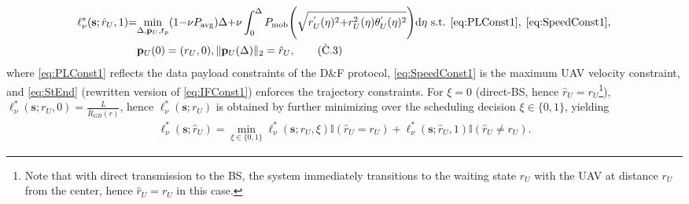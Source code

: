 \documentclass[12pt, draftcls, onecolumn]{IEEEtran}
\theoremstyle{plain}
\theoremstyle{definition}
\theoremstyle{remark}
\begin{document}
\begin{align}
    \ell_{\nu}^{*}(\mathbf{s};\hat{r}_{U},1){=}&\underset{\Delta,\mathbf{p}_{U},t_{p}}{\mathrm{min}}(1{-}\nu P_{\mathrm{avg}})\Delta{+}\nu\int_{0}^{\Delta}P_{\mathrm{mob}}\Bigg(\sqrt{r_{U}^{'}(\eta)^{2}{+}r_{U}^{2}(\eta)\theta_{U}^{'}(\eta)^{2}}\Bigg)\mathrm{d}\eta \text{ s.t.}\;\, \text{\ref{eq:PLConst1}},\; \text{\ref{eq:SpeedConst1}},\label{eq:EllMin}\\
    &\mathbf{p}_{U}(0) =(r_U,0), \Vert \mathbf{p}_{U}(\Delta)\Vert_{2} =\hat{r}_U,\tag{$\hat{\text{C}}$.3}\label{eq:StEnd}\
\end{align}
where \ref{eq:PLConst1} reflects the data payload constraints of the D\&F protocol, \ref{eq:SpeedConst1} is the maximum UAV velocity constraint, and \ref{eq:StEnd} (rewritten version of \ref{eq:IFConst1}) enforces the trajectory constraints. For $\xi{=}0$ (direct-BS, hence $\hat{r}_{U}{=}r_{U}$\footnote{Note that with direct transmission to the BS, the system immediately transitions to the waiting state $r_{U}$ with the UAV at distance $r_{U}$ from the center, hence $\hat{r}_{U}{=}r_{U}$ in this case.}), $\ell_{\nu}^{*}(\mathbf{s};r_{U},0){=}\frac{L}{\bar{R}_{GB}(r)}$, hence $\ell_{\nu}^{*}(\mathbf{s};r_{U})$ is obtained by further minimizing over the scheduling decision $\xi{\in}\{0,1\}$, yielding
\begin{align}\label{ellnushatru}
	\ell_{\nu}^* (\mathbf{s}; \hat r_U) = \underset{\xi\in\{0,1\}}{\min} \ell_{\nu}^* (\mathbf{s}; r_U,\xi)\mathbb{I}(\hat r_U = r_U) + \ell_{\nu}^* (\mathbf{s}; \hat r_U, 1)\mathbb{I} (\hat r_U \neq r_U).
\end{align}
\end{document}
